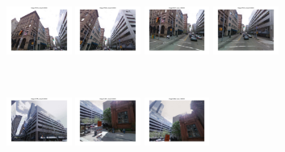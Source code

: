         \begin{minipage}{0.75\linewidth}
            \begin{minipage}{\linewidth} 
                \colorbox{myGreen}{\includegraphics[trim = 35mm 30mm 35mm 30mm, clip=true, height=16mm]{imgs/Pval/exImproved02/improvedPval01.jpg}}
                \colorbox{myGreen}{\includegraphics[trim = 35mm 30mm 35mm 30mm, clip=true, height=16mm]{imgs/Pval/exImproved02/improvedPval02.jpg}}
                \colorbox{myGreen}{\includegraphics[trim = 35mm 30mm 35mm 30mm, clip=true, height=16mm]{imgs/Pval/exImproved02/improvedPval03.jpg}}
                \colorbox{myGreen}{\includegraphics[trim = 35mm 30mm 35mm 30mm, clip=true, height=16mm]{imgs/Pval/exImproved02/improvedPval04.jpg}}
            \end{minipage}
            \\
            \begin{minipage}{\linewidth}
                \colorbox{myRed}{\includegraphics[trim = 35mm 30mm 35mm 30mm, clip=true, height=16mm]{imgs/Pval/exImproved02/improved01.jpg}}
                \colorbox{myRed}{\includegraphics[trim = 35mm 30mm 35mm 30mm, clip=true, height=16mm]{imgs/Pval/exImproved02/improved02.jpg}}
                \colorbox{myRed}{\includegraphics[trim = 35mm 30mm 35mm 30mm, clip=true, height=16mm]{imgs/Pval/exImproved02/improved03.jpg}}

\end{minipage}
\end{minipage}
